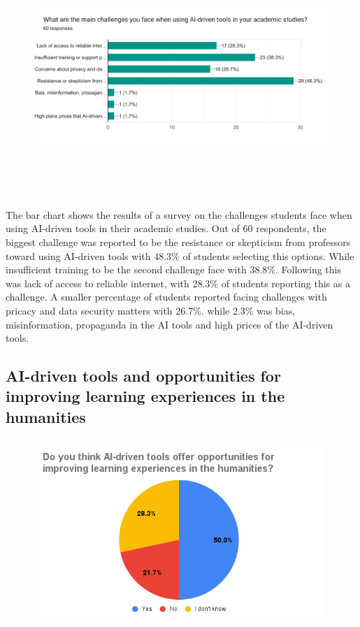 \begin{figure}[H]
	\centering
	\includegraphics[width=17cm, height=9cm]{./chap4/figures/chall}
\end{figure}

The bar chart shows the results of a survey on the challenges students
face when using AI-driven tools in their academic studies. Out of 60 respondents,
the biggest challenge was reported to be the resistance or skepticism from professors
toward using AI-driven tools with 48.3\% of students selecting this options.
While insufficient training to be the second challenge
face with 38.8\%.
Following this was lack of access to reliable internet, with 28.3\% of students
reporting this as a challenge.
A smaller percentage of students reported facing challenges with pricacy and data security matters
with 26.7\%. while 2.3\% was bias, misinformation, propaganda in the AI tools and high prices of the AI-driven tools.

\subsection{AI-driven tools and opportunities for improving learning experiences in the humanities }
\begin{figure}[H]
	\centering
	\includegraphics[width=11cm, height=7cm]{./chap4/figures/op.png}
\end{figure}

